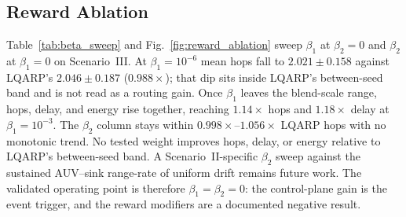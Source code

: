 \subsection{Reward Ablation}
\label{sec:eval:beta}

Table~\ref{tab:beta_sweep} and Fig.~\ref{fig:reward_ablation} sweep
$\beta_1$ at $\beta_2=0$ and $\beta_2$ at $\beta_1=0$ on
Scenario~III.
At $\beta_1=10^{-6}$ mean hops fall to $2.021\pm 0.158$ against
LQARP's $2.046\pm 0.187$ ($0.988\times$); that dip sits inside
LQARP's between-seed band and is not read as a routing gain.
Once $\beta_1$ leaves the blend-scale range, hops, delay, and
energy rise together, reaching $1.14\times$ hops and
$1.18\times$ delay at $\beta_1=10^{-3}$.
The $\beta_2$ column stays within $0.998\times$--$1.056\times$
LQARP hops with no monotonic trend.
No tested weight improves hops, delay, or energy relative to
LQARP's between-seed band.
A Scenario~II-specific $\beta_2$ sweep against the sustained
AUV--sink range-rate of uniform drift remains future work.
The validated operating point is therefore $\beta_1=\beta_2=0$:
the control-plane gain is the event trigger, and the reward
modifiers are a documented negative result.


